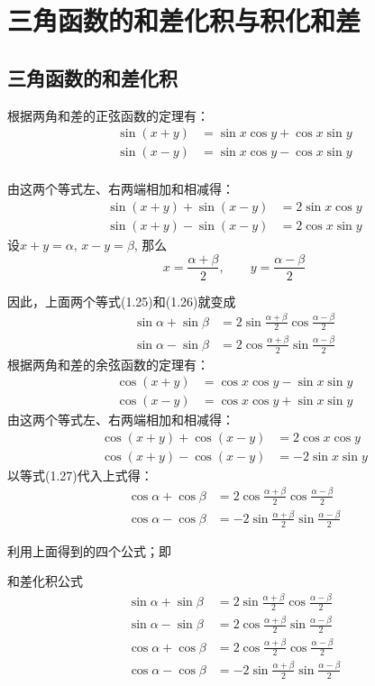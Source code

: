 \section{三角函数的和差化积与积化和差}
\subsection{三角函数的和差化积}

根据两角和差的正弦函数的定理有：
\[\begin{split}
    \sin(x+y)&=\sin x\cos y+\cos x\sin y\\
    \sin(x-y)&=\sin x\cos y-\cos x\sin y\\
\end{split}\]

由这两个等式左、右两端相加和相减得：
\begin{align}
 \sin (x+y) +\sin (x-y) &=2\sin x\cos y\\
\sin (x+y)-\sin (x-y) &=2\cos x\sin y   
\end{align}
设$x+y=\alpha$, $x-y=\beta$, 那么
\begin{equation}
    x=\frac{\alpha+\beta}{2},\qquad y=\frac{\alpha-\beta}{2}
\end{equation}

因此，上面两个等式(1.25)和(1.26)就变成
\begin{align*}
\sin\alpha+\sin\beta&=2\sin\frac{\alpha+\beta}{2}\cos\frac{\alpha-\beta}{2}\tag{I}\\
\sin\alpha-\sin\beta&=2\cos\frac{\alpha+\beta}{2}\sin\frac{\alpha-\beta}{2}\tag{II}
\end{align*}
根据两角和差的余弦函数的定理有：
\[\begin{split}
    \cos (x+y) &=\cos x\cos y - \sin x\sin y\\
\cos (x-y) &=\cos x\cos y +\sin x \sin y
\end{split}\]
由这两个等式左、右两端相加和相减得：
\begin{align}
    \cos (x+y) +\cos(x-y)&=2\cos x\cos y\\
\cos (x+y) -\cos (x-y) &=-2\sin x\sin y
\end{align}
以等式(1.27)代入上式得：
\begin{align*}
\cos\alpha+\cos\beta&=2\cos\frac{\alpha+\beta}{2}\cos\frac{\alpha-\beta}{2}\tag{III}\\
\cos\alpha-\cos\beta&=-2\sin\frac{\alpha+\beta}{2}\sin\frac{\alpha-\beta}{2}\tag{IV}
\end{align*}

利用上面得到的四个公式；即
\begin{blk}{和差化积公式}
\begin{align*}
    \sin\alpha+\sin\beta&=2\sin\frac{\alpha+\beta}{2}\cos\frac{\alpha-\beta}{2}\tag{I}\\
\sin\alpha-\sin\beta&=2\cos\frac{\alpha+\beta}{2}\sin\frac{\alpha-\beta}{2}\tag{II}\\
\cos\alpha+\cos\beta&=2\cos\frac{\alpha+\beta}{2}\cos\frac{\alpha-\beta}{2}\tag{III}\\
\cos\alpha-\cos\beta&=-2\sin\frac{\alpha+\beta}{2}\sin\frac{\alpha-\beta}{2}\tag{IV}
\end{align*}
\end{blk}

